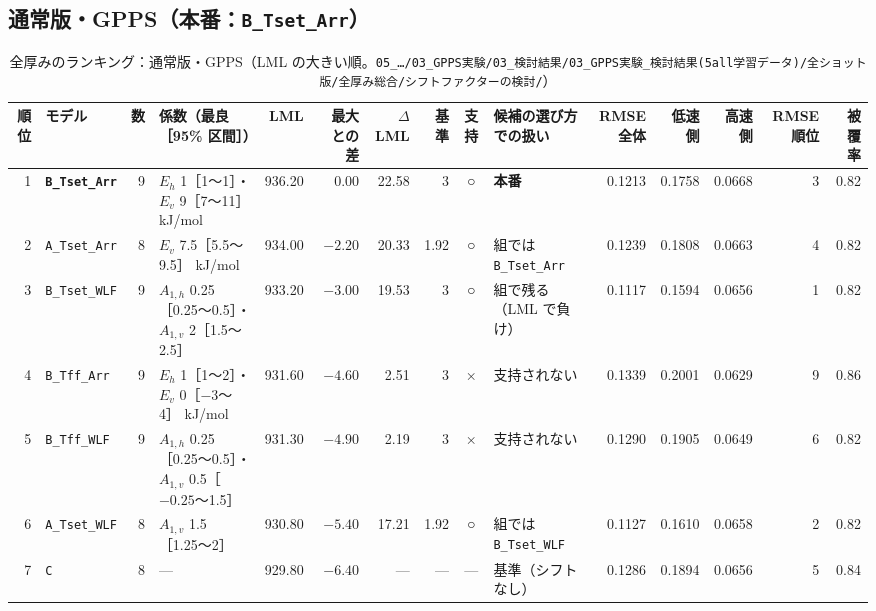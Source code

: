 \documentclass[paper=a4paper,landscape,fontsize=10pt,line_length=62zw,number_of_lines=34]{jlreq}
\let\origtextbf\textbf
\renewcommand{\textbf}[1]{\origtextbf{\gtfamily #1}}   %
\begin{document}
\subsection{通常版・GPPS（本番：\texttt{B\_\allowbreak{}Tset\_\allowbreak{}Arr}）}
\begin{table}[H]\centering\footnotesize
\caption{全厚みのランキング：通常版・GPPS（LML の大きい順。\texttt{05\_\allowbreak{}…/\allowbreak{}03\_\allowbreak{}GPPS実験/\allowbreak{}03\_\allowbreak{}検討結果/\allowbreak{}03\_\allowbreak{}GPPS実験\_\allowbreak{}検討結果(5all学習データ)/\allowbreak{}全ショット版/\allowbreak{}全厚み総合/\allowbreak{}シフトファクターの検討/\allowbreak{}}）}
\begin{tabular}{rlrp{12\zw}rrrrcp{8.5\zw}rrrrr}
\toprule
順位 & モデル & 数 & 係数（最良［95\% 区間］） & LML & 最大との差 & $\Delta$LML & 基準 & 支持 & 候補の選び方での扱い & RMSE 全体 & 低速側 & 高速側 & RMSE 順位 & 被覆率 \\
\midrule
1 & \textbf{\texttt{B\_\allowbreak{}Tset\_\allowbreak{}Arr}} & 9 & $E_h$ 1［1〜1］・$E_v$ 9［7〜11］ kJ/mol & 936.20 & 0.00 & 22.58 & 3 & ○ & \textbf{本番} & 0.1213 & 0.1758 & 0.0668 & 3 & 0.82 \\
2 & \texttt{A\_\allowbreak{}Tset\_\allowbreak{}Arr} & 8 & $E_v$ 7.5［5.5〜9.5］ kJ/mol & 934.00 & $-2.20$ & 20.33 & 1.92 & ○ & 組では \texttt{B\_\allowbreak{}Tset\_\allowbreak{}Arr} & 0.1239 & 0.1808 & 0.0663 & 4 & 0.82 \\
3 & \texttt{B\_\allowbreak{}Tset\_\allowbreak{}WLF} & 9 & $A_{1,h}$ 0.25［0.25〜0.5］・$A_{1,v}$ 2［1.5〜2.5］ & 933.20 & $-3.00$ & 19.53 & 3 & ○ & 組で残る（LML で負け） & 0.1117 & 0.1594 & 0.0656 & 1 & 0.82 \\
4 & \texttt{B\_\allowbreak{}Tff\_\allowbreak{}Arr} & 9 & $E_h$ 1［1〜2］・$E_v$ 0［$-3$〜4］ kJ/mol & 931.60 & $-4.60$ & 2.51 & 3 & × & 支持されない & 0.1339 & 0.2001 & 0.0629 & 9 & 0.86 \\
5 & \texttt{B\_\allowbreak{}Tff\_\allowbreak{}WLF} & 9 & $A_{1,h}$ 0.25［0.25〜0.5］・$A_{1,v}$ 0.5［$-0.25$〜1.5］ & 931.30 & $-4.90$ & 2.19 & 3 & × & 支持されない & 0.1290 & 0.1905 & 0.0649 & 6 & 0.82 \\
6 & \texttt{A\_\allowbreak{}Tset\_\allowbreak{}WLF} & 8 & $A_{1,v}$ 1.5［1.25〜2］ & 930.80 & $-5.40$ & 17.21 & 1.92 & ○ & 組では \texttt{B\_\allowbreak{}Tset\_\allowbreak{}WLF} & 0.1127 & 0.1610 & 0.0658 & 2 & 0.82 \\
7 & \texttt{C} & 8 & --- & 929.80 & $-6.40$ & --- & --- & --- & 基準（シフトなし） & 0.1286 & 0.1894 & 0.0656 & 5 & 0.84 \\

\end{tabular}
\end{table}
\end{document}
